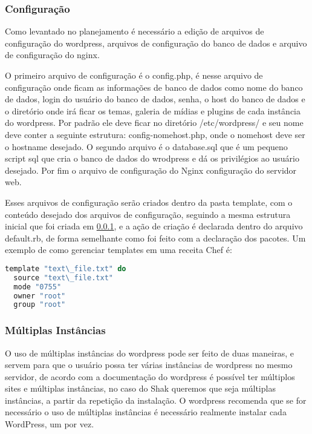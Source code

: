\subsubsection{Configuração}
\label{wordpress:preparacao}

Como levantado no planejamento é necessário a edição de arquivos de configuração
do wordpress, arquivos de configuração do banco de dados e arquivo de configuração
do nginx.

O primeiro arquivo de configuração é o config.php, é nesse arquivo de
configuração onde ficam as informações de banco de dados como nome do banco de dados,
login do usuário do banco de dados, senha, o host do banco de dados e o diretório
onde irá ficar os temas, galeria de mídias e plugins de cada instância do wordpress.
Por padrão ele deve ficar no diretório /etc/wordpress/ e seu nome deve conter
a seguinte estrutura: config-nomehost.php, onde o nomehost deve ser o hostname
desejado. O segundo arquivo é o database.sql que é um pequeno script sql que
cria o banco de dados do wrodpress e dá os privilégios ao usuário desejado. Por fim
o arquivo de configuração do Nginx configuração do servidor web.

Esses arquivos de configuração serão criados dentro da pasta template, com o conteúdo
desejado dos arquivos de configuração, seguindo a mesma estrutura
inicial que foi criada em \ref{wordpress:preparacao}, e a ação de criação é
declarada dentro do arquivo default.rb, de forma semelhante como foi feito com
a declaração dos pacotes. Um exemplo de como gerenciar templates em uma receita Chef
é:

\begin{lstlisting}[language=Ruby,label=dice_index,caption={Exemplo de criação de templates com o chef}]
  template "text\_file.txt" do
  source "text\_file.txt"
  mode "0755"
  owner "root"
  group "root"
\end{lstlisting}

\subsubsection{Múltiplas Instâncias}

O uso de múltiplas instâncias do wordpress pode ser feito de duas maneiras, e servem
para que o usuário possa ter várias instâncias de wordpress no mesmo servidor, de
acordo com a documentação do wordpress é possível ter múltiplos sites e múltiplas
instâncias, no caso do Shak queremos que seja múltiplas instâncias, a partir da
repetição da instalação. O wordpress recomenda que se for necessário o uso de múltiplas
instâncias é necessário realmente instalar cada WordPress, um por vez.

